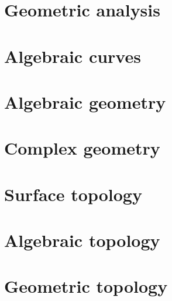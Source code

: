 \documentclass[12pt]{article}
\begin{document}
\section{Geometric analysis}


\section{Algebraic curves}
\section{Algebraic geometry}
\section{Complex geometry}

\section{Surface topology}
\section{Algebraic topology}
\section{Geometric topology}
\end{document}
